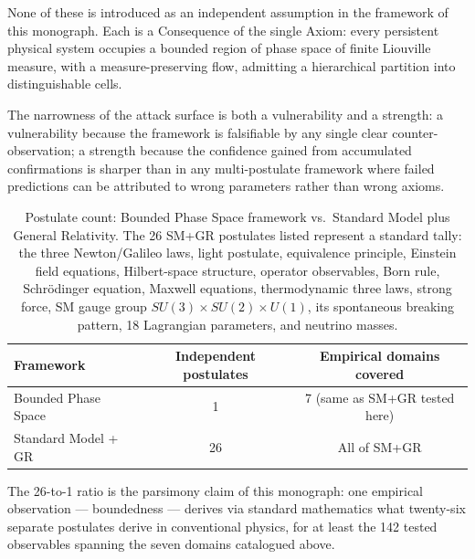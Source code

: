 None of these is introduced as an independent assumption in the framework of
this monograph.  Each is a Consequence of the single Axiom: every persistent
physical system occupies a bounded region of phase space of finite Liouville
measure, with a measure-preserving flow, admitting a hierarchical partition
into distinguishable cells.

The narrowness of the attack surface is both a vulnerability and a strength:
a vulnerability because the framework is falsifiable by any single clear
counter-observation; a strength because the confidence gained from
accumulated confirmations is sharper than in any multi-postulate framework
where failed predictions can be attributed to wrong parameters rather than
wrong axioms.

\begin{table}[htbp]
\centering
\caption{Postulate count: Bounded Phase Space framework vs.\
Standard Model plus General Relativity.  The 26 SM+GR postulates listed
represent a standard tally: the three Newton/Galileo laws, light postulate,
equivalence principle, Einstein field equations, Hilbert-space structure,
operator observables, Born rule, Schr\"odinger equation, Maxwell equations,
thermodynamic three laws, strong force, SM gauge group $SU(3)\times SU(2)\times U(1)$,
its spontaneous breaking pattern, 18 Lagrangian parameters, and
neutrino masses.}
\label{tab:parsimony}
\begin{tabular}{@{}lcc@{}}
\toprule
Framework & Independent postulates & Empirical domains covered \\
\midrule
Bounded Phase Space & 1 & 7 (same as SM+GR tested here) \\
Standard Model + GR & 26 & All of SM+GR \\
\bottomrule
\end{tabular}
\end{table}

The 26-to-1 ratio is the parsimony claim of this monograph: one empirical
observation --- boundedness --- derives via standard mathematics what
twenty-six separate postulates derive in conventional physics, for at least
the 142 tested observables spanning the seven domains catalogued above.
